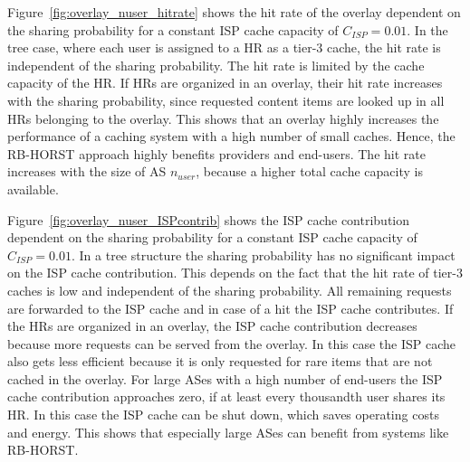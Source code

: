 Figure~\ref{fig:overlay_nuser_hitrate} shows the hit rate of the overlay dependent on the sharing probability for a constant ISP cache capacity of $C_{ISP}=0.01$. In the tree case, where each user is assigned to a HR as a tier-3 cache, the hit rate is independent of the sharing probability. The hit rate is limited by the cache capacity of the HR. If HRs are organized in an overlay, their hit rate increases with the sharing probability, since requested content items are looked up in all HRs belonging to the overlay. This shows that an overlay highly increases the performance of a caching system with a high number of small caches. Hence, the RB-HORST approach highly benefits providers and end-users. The hit rate increases with the size of AS $n_{user}$, because a higher total cache capacity is available.




Figure~\ref{fig:overlay_nuser_ISPcontrib} shows the ISP cache contribution dependent on the sharing probability for a constant ISP cache capacity of $C_{ISP}=0.01$. In a tree structure the sharing probability has no significant impact on the ISP cache contribution. This depends on the fact that the hit rate of tier-3 caches is low and independent of the sharing probability. All remaining requests are forwarded to the ISP cache and in case of a hit the ISP cache contributes. If the HRs are organized in an overlay, the ISP cache contribution decreases because more requests can be served from the overlay. In this case the ISP cache also gets less efficient because it is only requested for rare items that are not cached in the overlay.
For large ASes with a high number of end-users the ISP cache contribution approaches zero, if at least every thousandth user shares its HR. In this case the ISP cache can be shut down, which saves operating costs and energy. This shows that especially large ASes can benefit from systems like RB-HORST.

